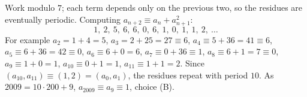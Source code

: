 Work modulo $7$; each term depends only on the previous two, so the residues are eventually periodic. Computing $a_{n+2}\equiv a_n+a_{n+1}^2$:
\[
1,\ 2,\ 5,\ 6,\ 6,\ 0,\ 6,\ 1,\ 0,\ 1,\ 1,\ 2,\ \dots
\]
For example $a_2=1+4=5$, $a_3=2+25=27\equiv6$, $a_4\equiv5+36=41\equiv6$, $a_5\equiv6+36=42\equiv0$, $a_6\equiv6+0=6$, $a_7\equiv0+36\equiv1$, $a_8\equiv6+1=7\equiv0$, $a_9\equiv1+0=1$, $a_{10}\equiv0+1=1$, $a_{11}\equiv1+1=2$. Since $(a_{10},a_{11})\equiv(1,2)=(a_0,a_1)$, the residues repeat with period $10$. As $2009=10\cdot200+9$, $a_{2009}\equiv a_9\equiv\boxed{1}$, choice (B).

